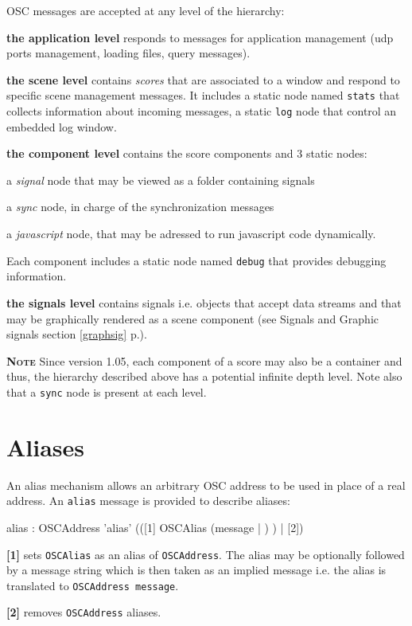 \documentclass[a4paper,twoside]{report}
\newcommand{\sublevel}[1]	{\section{#1}}
\newcommand{\fullref}[1]	{\ref{#1} p.\pageref{#1}}
\newcommand{\OSC}[1]		{\texttt{#1}}
\newcommand{\note}	[1]		{\vspace{2mm}\textbf{\hspace{-0.9cm}\textbf{\textsc{Note #1}}}}
\let\olditemize\itemize
\let\oldenditemize\enditemize
\renewenvironment{itemize} 	{\olditemize \setlength{\itemsep}{1mm}}{\oldenditemize}
\begin{document}
OSC messages are accepted at any level of the hierarchy:
\begin{itemize}

\item \textbf{the application level} responds to messages for application management (udp ports management, loading files, query messages). \\

\item \textbf{the scene level} contains \emph{scores} that are associated to a window and respond to specific scene management messages. 
It includes a static node named \OSC{stats} that collects information about incoming messages, a static \OSC{log} node that control an embedded log window.


\item \textbf{the component level} contains the score components and 3 static nodes:
\begin{itemize}
\item a \emph{signal} node that may be viewed as a folder containing signals
\item a \emph{sync} node, in charge of the synchronization messages
\item a \emph{javascript} node, that may be adressed to run javascript code dynamically.
\end{itemize}

Each component includes a static node named \OSC{debug} that provides debugging information.
\item \textbf{the signals level} contains signals i.e. objects that accept data streams and that may be graphically rendered as a scene component (see Signals and Graphic signals section \fullref{graphsig}).

\end{itemize}

\note{} Since version 1.05, each component of a score may also be a container and thus, the hierarchy described above has a potential infinite depth level. Note also that a \OSC{sync} node is present at each level. 


\sublevel{Aliases}
\label{alias}
An alias mechanism allows an arbitrary OSC address to be used in place of a real address. An \OSC{alias} message is provided to describe aliases: 
\begin{rail}
alias : OSCAddress 'alias' (([1] OSCAlias (message | ) ) | [2])
\end{rail}
\begin{itemize}
\item \textbf{[1]} sets \OSC{OSCAlias} as an alias of \OSC{OSCAddress}. The alias may be optionally followed by a message string which is then taken as an implied message i.e. the alias is translated to \OSC{OSCAddress message}.
\item \textbf{[2]} removes \OSC{OSCAddress} aliases.
\end{itemize}
\end{document}
